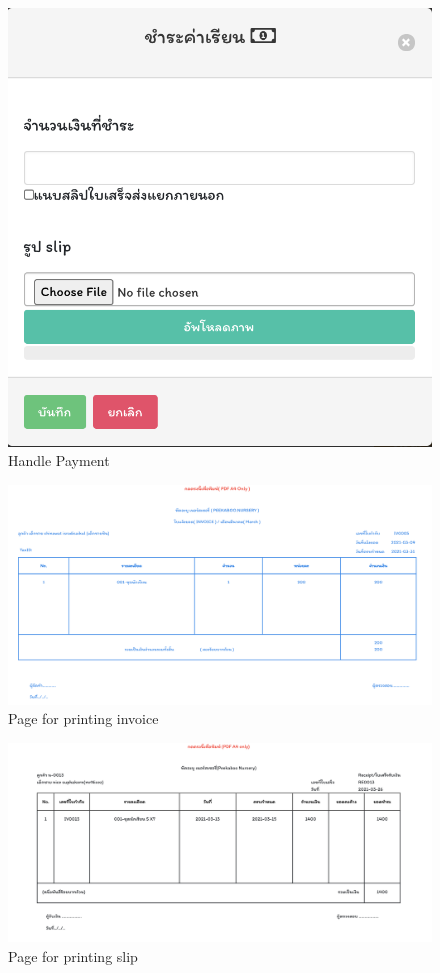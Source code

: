 \begin{figure}
  \begin{center}
  \includegraphics[width=\linewidth]{images/UpdatePayment.png}
  \end{center}
  \caption[หน้าชำระค่าใช้จ่าย]{Handle Payment}
  \label{fig:updatePayment}
  \end{figure}
\begin{figure}
  \begin{center}
  \includegraphics[width=\linewidth]{images/invoicePage.png}
  \end{center}
  \caption[หน้าปริ้นใบแจ้งยอด]{Page for printing invoice}
  \label{fig:invoicePage}
  \end{figure}
\begin{figure}
  \begin{center}
  \includegraphics[width=\linewidth]{images/slipPage.png}
  \end{center}
  \caption[หน้าปริ้นใบเสร็จ]{Page for printing slip}
  \label{fig:slipPage}
  \end{figure}